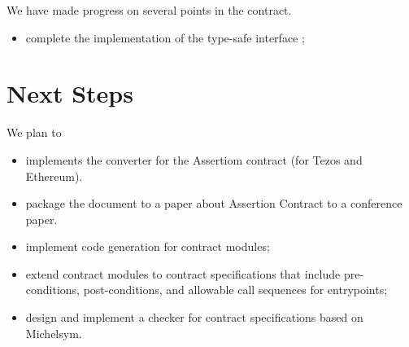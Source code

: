 \documentclass[a4paper,11pt]{article}
\begin{document}
We have made progress on several points in the contract.
\begin{itemize}
\item complete the implementation of the type-safe interface ;
\
\end{itemize}


\section{Next Steps}

We plan to 
\begin{itemize}
\item implements the converter for the Assertiom contract (for Tezos and Ethereum). 
\item package the document to a paper about Assertion Contract to a conference paper.
\item implement code generation for contract modules; 
\item extend contract modules to contract specifications that include pre-conditions, post-conditions, and allowable call sequences for entrypoints; 
\item design and implement a checker for contract specifications based on Michelsym.
\end{itemize}





\end{document}
